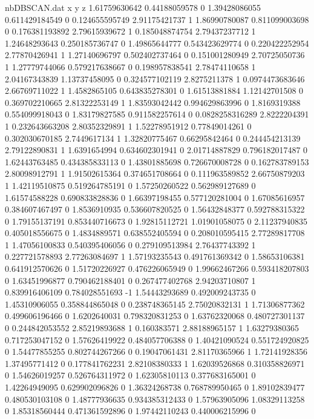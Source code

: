 \begin{filecontents}{nbDBSCAN.dat}
x y z
1.61759630642 0.44188059578 0
1.39428086055 0.611429184549 0
0.124655595749 2.91175421737 1
1.86990780087 0.811099003698 0
0.176381193892 2.79615939672 1
0.185048874754 2.79437237712 1
1.24648293643 0.250185736747 0
1.49865644777 0.543423629774 0
0.220422252954 2.77870426941 1
1.27140696797 0.502402737464 0
0.151001280949 2.70725050736 1
1.27779744066 0.579217638667 0
0.198957838541 2.78474110658 1
2.04167343839 1.13737458095 0
0.324577102119 2.8275211378 1
0.0974473683646 2.66769711022 1
1.4582865105 0.643835278301 0
1.61513881884 1.12142701508 0
0.369702210665 2.81322253149 1
1.83593042442 0.994629863996 0
1.8169319388 0.554099918043 0
1.83179827585 0.911582257614 0
0.0828258316289 2.8222204391 1
0.232643663208 2.80352329891 1
1.52278951912 0.77849014261 0
0.302030670185 2.7449617134 1
1.32820775467 0.66295842464 0
0.244454213139 2.79122890831 1
1.6391654994 0.634602301941 0
2.01714887829 0.796182017487 0
1.62443763485 0.434385833113 0
1.43801885698 0.726670008728 0
0.162783789153 2.80098912791 1
1.91502615364 0.374651708664 0
0.111963589852 2.66750879203 1
1.42119510875 0.519264785191 0
1.57250260522 0.562989127689 0
1.61574588228 0.690833828836 0
1.66397198455 0.577120281004 0
1.67085616957 0.384607467497 0
1.8536910935 0.536607820525 0
1.56432848377 0.592788315322 0
1.79155137191 0.853440716673 0
1.92815112721 1.01901058075 0
2.11237940835 0.405018556675 0
1.4834889571 0.638552405594 0
0.208010595415 2.77289817708 1
1.47056100833 0.540395406056 0
0.279109513984 2.76437743392 1
0.227721578893 2.77263084697 1
1.57193235543 0.491761369342 0
1.58653106381 0.641912570626 0
1.51720226927 0.476226065949 0
1.99662467266 0.593418207803 0
1.63451996877 0.790462188401 0
0.267477402768 2.94203710807 1
0.839916406109 0.784028551693 -1
1.54443293689 0.492009243735 0
1.45310906055 0.358844865048 0
0.238748365145 2.75020832131 1
1.71306877362 0.499606196466 0
1.6202640031 0.798320831253 0
1.63762320068 0.480727301137 0
0.244842053552 2.85219893688 1
0.160383571 2.88188965157 1
1.63279380365 0.717253047152 0
1.57626419922 0.484057706388 0
1.40421090524 0.551724920825 0
1.54477855255 0.802744267266 0
0.19047061431 2.81170365966 1
1.72141928356 1.37495771412 0
0.177841762231 2.82108380333 1
1.62039526868 0.310358826971 0
1.54626019257 0.526764311972 0
1.62305810113 0.377683165001 0
1.42264949095 0.629902096826 0
1.36324268738 0.768789950465 0
1.89102839477 0.480530103108 0
1.48777936635 0.934385312433 0
1.57963905096 1.08329113258 0
1.85318560444 0.471361592896 0
1.97442110243 0.440006215996 0

\end{filecontents}
